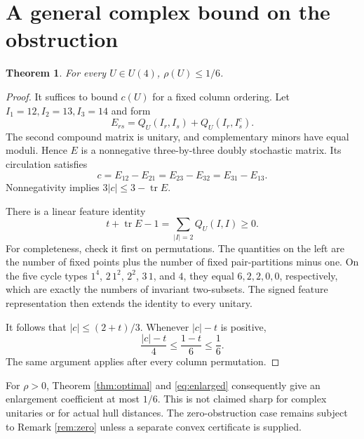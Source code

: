 \documentclass[11pt,a4paper]{article}
\newtheorem{theorem}{Theorem}[section]
\newcommand{\tr}{\operatorname{tr}}
\begin{document}
\section{A general complex bound on the obstruction}
\begin{theorem}\label{thm:complexbound}
For every $U\in U(4)$, $\rho(U)\le1/6$.
\end{theorem}
\begin{proof}
It suffices to bound $c(U)$ for a fixed column ordering. Let $I_1=12,I_2=13,I_3=14$ and form
\[
E_{rs}=Q_U(I_r,I_s)+Q_U(I_r,I_s^c).
\]
The second compound matrix is unitary, and complementary minors have equal moduli. Hence $E$ is a nonnegative three-by-three doubly stochastic matrix. Its circulation satisfies
\[
c=E_{12}-E_{21}=E_{23}-E_{32}=E_{31}-E_{13}.
\]
Nonnegativity implies $3|c|\le3-\tr E$.

There is a linear feature identity
\begin{equation}\label{eq:traceidentity}
t+\tr E-1=\sum_{|I|=2}Q_U(I,I)\ge0.
\end{equation}
For completeness, check it first on permutations. The quantities on the left are the number of fixed points plus the number of fixed pair-partitions minus one. On the five cycle types $1^4$, $2\,1^2$, $2^2$, $3\,1$, and $4$, they equal $6,2,2,0,0$, respectively, which are exactly the numbers of invariant two-subsets. The signed feature representation then extends the identity to every unitary.

It follows that $|c|\le(2+t)/3$. Whenever $|c|-t$ is positive,
\[
\frac{|c|-t}{4}\le\frac{1-t}{6}\le\frac16.
\]
The same argument applies after every column permutation.
\end{proof}
For $\rho>0$, Theorem \ref{thm:optimal} and \eqref{eq:enlarged} consequently give an enlargement coefficient at most $1/6$. This is not claimed sharp for complex unitaries or for actual hull distances. The zero-obstruction case remains subject to Remark \ref{rem:zero} unless a separate convex certificate is supplied.
\end{document}
